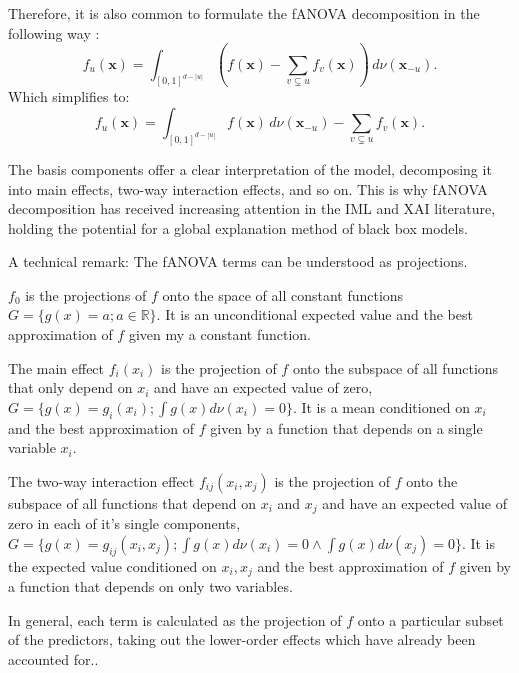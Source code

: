 Therefore, it is also common to formulate the fANOVA decomposition in the following way \citep{hooker2007,hooker2004}:
\begin{equation}
    f_u(\mathbf{x}) = \int_{[0,1]^{d - |u|}} \left( f(\mathbf{x}) - \sum_{v \subsetneq u} f_v(\mathbf{x}) \right) \, d\nu(\mathbf{x}_{-u}).
\end{equation}
Which simplifies to:
\begin{equation}
    f_u(\mathbf{x}) = \int_{[0,1]^{d - |u|}} f(\mathbf{x}) \, d\nu(\mathbf{x}_{-u}) - \sum_{v \subsetneq u} f_v(\mathbf{x}).
\end{equation}

The basis components offer a clear interpretation of the model, decomposing it into main effects, two-way interaction effects, and so on. This is why fANOVA decomposition has received increasing attention in the IML and XAI literature, holding the potential for a global explanation method of black box models.\par

A technical remark: The fANOVA terms can be understood as projections.\par

$f_0$ is the projections of $f$ onto the space of all constant functions $G = \{g(x) = a; a \in \mathbb{R}\}$. It is an unconditional expected value and the best approximation of $f$ given my a constant function.\par

The main effect $f_i(x_i)$ is the projection of $f$ onto the subspace of all functions that only depend on $x_i$ and have an expected value of zero, $G = \{g(x) = g_i(x_i); \int g(x) d\nu (x_i) = 0\}$. It is a mean conditioned on $x_i$ and the best approximation of $f$ given by a function that depends on a single variable $x_i$.\par

The two-way interaction effect $f_{ij}(x_i,x_j)$ is the projection of $f$ onto the subspace of all functions that depend on $x_i$ and $x_j$ and have an expected value of zero in each of it's single components, $G = \{g(x) = g_{ij}(x_i, x_j); \int g(x) d\nu (x_i) = 0 \land \int g(x) d\nu (x_j) = 0\}$. It is the expected value conditioned on $x_i, x_j$ and the best approximation of $f$ given by a function that depends on only two variables.\par
In general, \ldq each term is calculated as the projection of $f$ onto a particular subset of the predictors, taking out the lower-order effects which have already been accounted for.\rdq \cite{hooker2004}.\par

